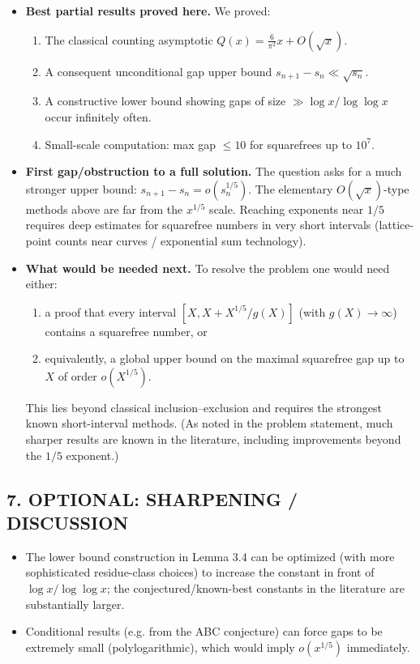 \begin{itemize}
\item[(i)] \textbf{Best partial results proved here.}
We proved:
\begin{enumerate}
\item The classical counting asymptotic $Q(x)=\frac{6}{\pi^2}x+O(\sqrt{x})$.
\item A consequent unconditional gap upper bound $s_{n+1}-s_n\ll\sqrt{s_n}$.
\item A constructive lower bound showing gaps of size $\gg \log x/\log\log x$ occur infinitely often.
\item Small-scale computation: max gap $\le 10$ for squarefrees up to $10^7$.
\end{enumerate}

\item[(ii)] \textbf{First gap/obstruction to a full solution.}
The question asks for a much stronger upper bound: $s_{n+1}-s_n=o(s_n^{1/5})$.
The elementary $O(\sqrt{x})$-type methods above are far from the $x^{1/5}$ scale.
Reaching exponents near $1/5$ requires deep estimates for squarefree numbers in very short intervals (lattice-point counts near curves / exponential sum technology).

\item[(iii)] \textbf{What would be needed next.}
To resolve the problem one would need either:
\begin{enumerate}
\item a proof that every interval $[X,X+X^{1/5}/g(X)]$ (with $g(X)\to\infty$) contains a squarefree number, or
\item equivalently, a global upper bound on the maximal squarefree gap up to $X$ of order $o(X^{1/5})$.
\end{enumerate}
This lies beyond classical inclusion--exclusion and requires the strongest known short-interval methods.
(As noted in the problem statement, much sharper results are known in the literature, including improvements beyond the $1/5$ exponent.)
\end{itemize}

\subsection*{7. OPTIONAL: SHARPENING / DISCUSSION}
\begin{itemize}
\item The lower bound construction in Lemma 3.4 can be optimized (with more sophisticated residue-class choices) to increase the constant in front of $\log x/\log\log x$; the conjectured/known-best constants in the literature are substantially larger.
\item Conditional results (e.g. from the ABC conjecture) can force gaps to be extremely small (polylogarithmic), which would imply $o(x^{1/5})$ immediately.
\end{itemize}


